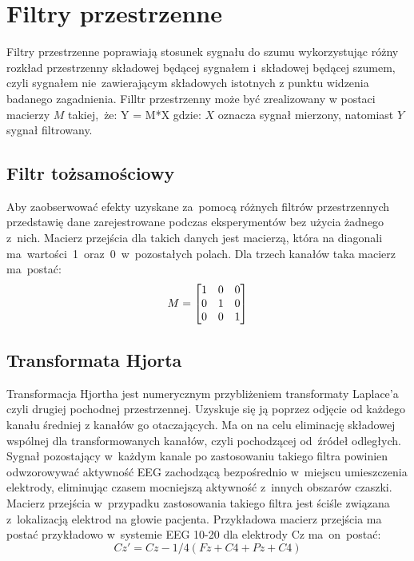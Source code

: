 \documentclass[licencjacka,openright]{pracamgr}
\begin{document}
\section{Filtry przestrzenne}
Filtry przestrzenne poprawiają stosunek sygnału do szumu wykorzystując różny rozkład przestrzenny składowej będącej sygnałem i~składowej będącej szumem, czyli sygnałem nie~zawierającym składowych istotnych z punktu widzenia badanego zagadnienia.
Filltr przestrzenny może być zrealizowany w postaci macierzy $M$ takiej,~że: 
Y = M*X
gdzie: $X$ oznacza sygnał mierzony, natomiast $Y$ sygnał filtrowany.


\subsection{Filtr tożsamościowy}
Aby zaobserwować efekty uzyskane za~pomocą różnych filtrów przestrzennych przedstawię dane zarejestrowane podczas eksperymentów bez użycia żadnego z~nich. Macierz przejścia dla takich danych jest macierzą, która na diagonali ma~wartości~1~oraz~0~w~pozostałych polach.
Dla trzech kanałów taka macierz ma~postać:
\[
M =
\begin{bmatrix}
  $1$ & $0$ & $0$ \\
  $0$ & $1$ & $0$ \\
  $0$ & $0$ & $1$ 
\end{bmatrix}
\]

\subsection{Transformata Hjorta}
Transformacja Hjortha jest numerycznym przybliżeniem transformaty Laplace'a czyli drugiej pochodnej przestrzennej. Uzyskuje się ją poprzez odjęcie od każdego kanału średniej z kanałów go otaczających. Ma on na celu eliminację składowej wspólnej dla transformowanych kanałów, czyli pochodzącej od~źródeł odległych. Sygnał pozostający w~każdym kanale po zastosowaniu takiego filtra powinien odwzorowywać aktywność EEG zachodzącą bezpośrednio w~miejscu umieszczenia elektrody, eliminując czasem mocniejszą aktywność z~innych obszarów czaszki.
Macierz przejścia w~przypadku zastosowania takiego filtra jest ściśle związana z~lokalizacją elektrod na głowie pacjenta.
Przykładowa macierz przejścia ma postać przykładowo w~systemie EEG 10-20 dla elektrody Cz ma~on~postać:
\begin{equation}
Cz' = Cz - 1/4(Fz+C4+Pz+C4)
\end{equation}
\end{document}
